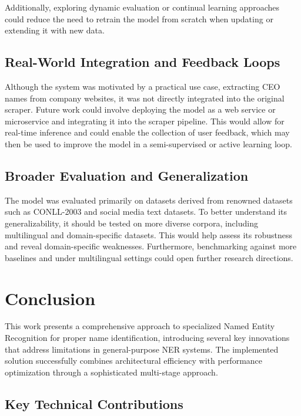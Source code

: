 \documentclass[a4paper]{usiinfbachelorproject}
\begin{document}
Additionally, exploring dynamic evaluation or continual learning approaches could reduce the need to retrain the model from scratch when updating or extending it with new data.

\subsection{Real-World Integration and Feedback Loops}

Although the system was motivated by a practical use case, extracting CEO names from company websites, it was not directly integrated into the original scraper. Future work could involve deploying the model as a web service or microservice and integrating it into the scraper pipeline. This would allow for real-time inference and could enable the collection of user feedback, which may then be used to improve the model in a semi-supervised or active learning loop.

\subsection{Broader Evaluation and Generalization}

The model was evaluated primarily on datasets derived from renowned datasets such as CONLL-2003 and social media text datasets. To better understand its generalizability, it should be tested on more diverse corpora, including multilingual and domain-specific datasets. This would help assess its robustness and reveal domain-specific weaknesses. Furthermore, benchmarking against more baselines and under multilingual settings could open further research directions.

\section{\textbf{Conclusion}}

This work presents a comprehensive approach to specialized Named Entity Recognition for proper name identification, introducing several key innovations that address limitations in general-purpose NER systems. The implemented solution successfully combines architectural efficiency with performance optimization through a sophisticated multi-stage approach.

\subsection{Key Technical Contributions}
\end{document}
